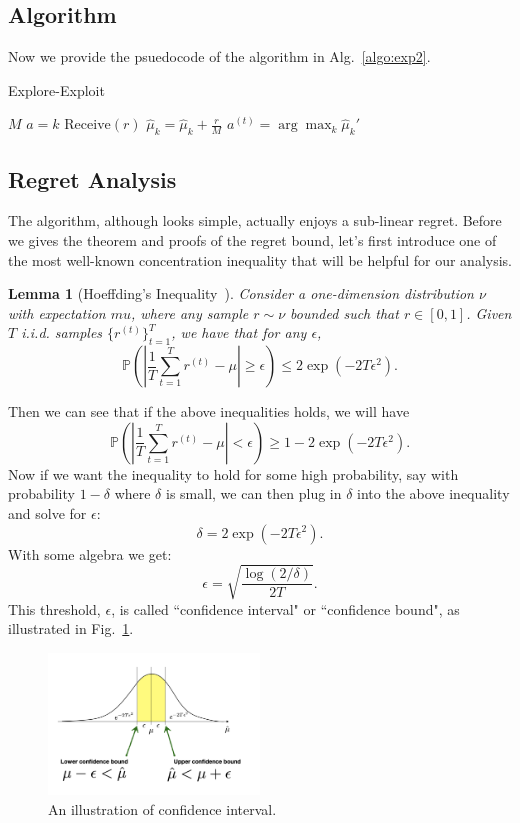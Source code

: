 \documentclass[11pt]{article}
\newtheorem{lemma}[theorem]{Lemma}
\begin{document}
\subsection{Algorithm}
Now we provide the psuedocode of the algorithm in 
Alg.~\ref{algo:exp2}.

\begin{algorithm}[H]
\caption{Explore-Exploit}
\label{algo:exp2}
\begin{algorithmic}[1]
\REQUIRE $M$
\STATE $a = k$
\STATE $\text{Receive}(r)$
\STATE $\widehat{\mu}_k = \widehat{\mu}_k + \frac{r}{M}$
\ENDFOR
\ENDFOR
{}
\STATE $a^{(t)} = \arg\max_{k}\widehat{\mu}_k'$
\ENDFOR
\end{algorithmic}
\end{algorithm}

\subsection{Regret Analysis}
The algorithm, although looks simple, actually enjoys a sub-linear regret. Before we gives the theorem and proofs of the regret bound, let's first introduce one of the most well-known concentration inequality that will be helpful for our analysis.
\begin{lemma}[Hoeffding’s Inequality~\cite{hoeffding1994probability}]
Consider a one-dimension distribution $\nu$ with expectation $mu$, where any sample $r \sim \nu$ bounded such that $r \in [0,1]$. Given $T$ i.i.d. samples $\{r^{(t)}\}_{t=1}^T$, we have that for any $\epsilon$, 
\[\mathbb{P}\left( \left|\frac{1}{T} \sum_{t=1}^T  r^{(t)}-\mu\right| \geq \epsilon \right) \leq 2\exp{(-2T\epsilon^2)}.\]
\end{lemma}

Then we can see that if the above inequalities holds, we will have 
\[\mathbb{P}\left( \left|\frac{1}{T} \sum_{t=1}^T  r^{(t)}-\mu\right| < \epsilon \right) \geq 1- 2\exp{(-2T\epsilon^2)}.\]
Now if we want the inequality to hold for some high probability, say with probability $1-\delta$ where $\delta$ is small, we can then plug in $\delta$ into the above inequality and solve for $\epsilon$:
\[\delta = 2\exp{(-2T\epsilon^2)}.\]
With some algebra we get:
\[\epsilon = \sqrt{\frac{\log(2/\delta)}{2T}}.\]
This threshold, $\epsilon$, is called ``confidence interval" or ``confidence bound", as illustrated in Fig.~\ref{fig:confid}.
\begin{figure}[t]
    \centering
    \includegraphics[width=0.5\textwidth]{figs/confidence_region.png}
    \caption{An illustration of confidence interval.}
    \label{fig:confid}
\end{figure}
\end{document}
